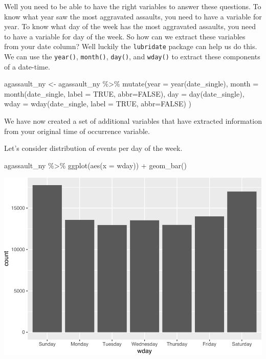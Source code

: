 \documentclass[
  krantz2]{krantz}
\makeatletter
\newenvironment{Shaded}{\begin{snugshade}}{\end{snugshade}}
\newcommand{\AttributeTok}[1]{\textcolor[rgb]{0.61,0.61,0.61}{#1}}
\newcommand{\ConstantTok}[1]{\textcolor[rgb]{0,0,0}{#1}}
\newcommand{\FunctionTok}[1]{\textcolor[rgb]{0,0,0}{#1}}
\newcommand{\NormalTok}[1]{#1}
\newcommand{\OtherTok}[1]{\textcolor[rgb]{0.37,0.37,0.37}{#1}}
\newcommand{\SpecialCharTok}[1]{\textcolor[rgb]{0,0,0}{#1}}
\newenvironment{kframe}{%
\medskip{}
\setlength{\fboxsep}{.8em}
 \def\at@end@of@kframe{}%
 \ifinner\ifhmode%
  \def\at@end@of@kframe{\end{minipage}}%
  \begin{minipage}{\columnwidth}%
 \fi\fi%
 \def\FrameCommand##1{\hskip\@totalleftmargin \hskip-\fboxsep
 \colorbox{shadecolor}{##1}\hskip-\fboxsep
     \hskip-\linewidth \hskip-\@totalleftmargin \hskip\columnwidth}%
 \MakeFramed {\advance\hsize-\width
   \@totalleftmargin\z@ \linewidth\hsize
   \@setminipage}}%
 {\par\unskip\endMakeFramed%
 \at@end@of@kframe}
\renewenvironment{Shaded}{\begin{kframe}}{\end{kframe}}
\makeatother
\begin{document}
Well you need to be able to have the right variables to answer these questions. To know what year saw the most aggravated assaults, you need to have a variable for year. To know what day of the week has the most aggravated assaults, you need to have a variable for day of the week. So how can we extract these variables from your date column? Well luckily the \texttt{lubridate} package can help us do this. We can use the \texttt{year()}, \texttt{month()}, \texttt{day()}, and \texttt{wday()} to extract these components of a date-time.

\begin{Shaded}
\begin{Highlighting}[]
\NormalTok{agassault\_ny }\OtherTok{\textless{}{-}}\NormalTok{ agassault\_ny }\SpecialCharTok{\%\textgreater{}\%} 
  \FunctionTok{mutate}\NormalTok{(}\AttributeTok{year =} \FunctionTok{year}\NormalTok{(date\_single), }
         \AttributeTok{month =} \FunctionTok{month}\NormalTok{(date\_single, }\AttributeTok{label =} \ConstantTok{TRUE}\NormalTok{, }\AttributeTok{abbr=}\ConstantTok{FALSE}\NormalTok{), }
         \AttributeTok{day =} \FunctionTok{day}\NormalTok{(date\_single), }
         \AttributeTok{wday =} \FunctionTok{wday}\NormalTok{(date\_single, }\AttributeTok{label =} \ConstantTok{TRUE}\NormalTok{, }\AttributeTok{abbr=}\ConstantTok{FALSE}\NormalTok{)}
\NormalTok{         )}
\end{Highlighting}
\end{Shaded}

We have now created a set of additional variables that have extracted information from your original time of occurrence variable.

Let's consider distribution of events per day of the week.

\begin{Shaded}
\begin{Highlighting}[]
\NormalTok{agassault\_ny }\SpecialCharTok{\%\textgreater{}\%} 
  \FunctionTok{ggplot}\NormalTok{(}\FunctionTok{aes}\NormalTok{(}\AttributeTok{x =}\NormalTok{ wday)) }\SpecialCharTok{+}
    \FunctionTok{geom\_bar}\NormalTok{()}
\end{Highlighting}
\end{Shaded}

\includegraphics{crime_mapping_files/figure-latex/assaults_per_wday-1.pdf}
\end{document}
